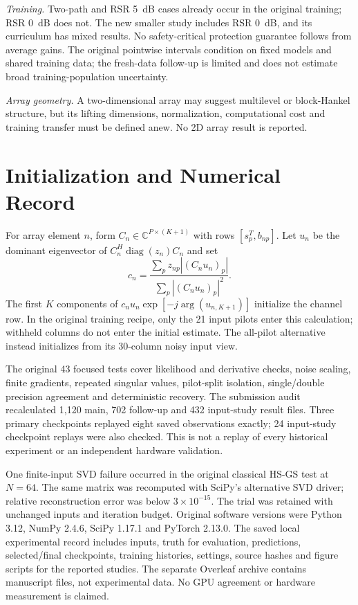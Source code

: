 \documentclass[journal]{IEEEtran}
\DeclareMathOperator{\diag}{diag}
\begin{document}
\textit{Training.} Two-path and RSR 5~dB cases already occur in the original
training; RSR 0~dB does not. The new smaller study includes RSR 0~dB,
and its curriculum has mixed results. No safety-critical protection
guarantee follows from average gains. The original pointwise
intervals condition on fixed models and shared training data; the
fresh-data follow-up is limited and does not estimate broad
training-population uncertainty.

\textit{Array geometry.} A two-dimensional array may suggest multilevel
or block-Hankel structure, but its lifting dimensions, normalization,
computational cost and training transfer must be defined anew. No 2D
array result is reported.

\section{Initialization and Numerical Record}
For array element $n$, form $C_n\in\mathbb C^{P\times(K+1)}$ with rows
$[s_p^T,b_{np}]$. Let $u_n$ be the dominant eigenvector of
$C_n^H\diag(z_n)C_n$ and set
\begin{equation}
 c_n=\frac{\sum_p z_{np}|(C_nu_n)_p|}{\sum_p|(C_nu_n)_p|^2}.
\end{equation}
The first $K$ components of $c_nu_n\exp[-j\arg(u_{n,K+1})]$ initialize
the channel row. In the original training recipe, only the 21 input pilots
enter this calculation; withheld columns do not enter the initial estimate.
The all-pilot alternative instead initializes from its 30-column noisy input view.

The original 43 focused tests cover likelihood and derivative checks,
noise scaling, finite gradients, repeated singular values, pilot-split
isolation, single/double precision agreement and deterministic recovery.
The submission audit recalculated 1,120 main, 702 follow-up and 432
input-study result files. Three primary checkpoints replayed eight saved
observations exactly; 24 input-study checkpoint replays were also checked.
This is not a replay of every historical experiment or an independent
hardware validation.

One finite-input SVD failure occurred in the original classical HS-GS
test at $N=64$. The same matrix was recomputed with SciPy's alternative
SVD driver; relative reconstruction error was below $3\times10^{-15}$.
The trial was retained with unchanged inputs and iteration budget.
Original software versions were Python 3.12, NumPy 2.4.6, SciPy 1.17.1
and PyTorch 2.13.0. The saved local experimental record includes inputs, truth
for evaluation, predictions, selected/final checkpoints, training histories,
settings, source hashes and figure scripts for the reported studies.
The separate Overleaf archive contains manuscript files, not experimental
data. No GPU agreement or hardware measurement is claimed.


\end{document}
